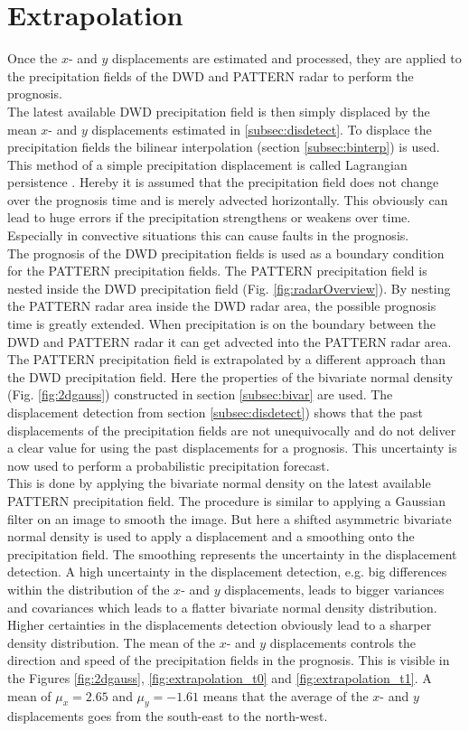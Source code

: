 \documentclass[11pt,twoside,a4paper,fleqn,x11names]{report}
\numberwithin{equation}{chapter}
\numberwithin{figure}{chapter}
\numberwithin{table}{chapter}
\begin{document}
\section{Extrapolation}
\label{subsec:extrapolation}
Once the $x$- and $y$ displacements are estimated and processed, they are applied to the precipitation fields of the DWD and PATTERN radar to perform the prognosis. \\
The latest available DWD precipitation field is then simply displaced by the mean $x$- and $y$ displacements estimated in \ref{subsec:disdetect}. To displace the precipitation fields the bilinear interpolation (section \ref{subsec:binterp}) is used. This method of a simple precipitation displacement is called Lagrangian persistence \citep{Germann}. Hereby it is assumed that the precipitation field does not change over the prognosis time and is merely advected horizontally. This obviously can lead to huge errors if the precipitation strengthens or weakens over time. Especially in convective situations this can cause faults in the prognosis. \\
The prognosis of the DWD precipitation fields is used as a boundary condition for the PATTERN precipitation fields. The PATTERN precipitation field is nested inside the DWD precipitation field (Fig. \ref{fig:radarOverview}). By nesting the PATTERN radar area inside the DWD radar area, the possible prognosis time is greatly extended. When precipitation is on the boundary between the DWD and PATTERN radar it can get advected into the PATTERN radar area.\\
The PATTERN precipitation field is extrapolated by a different approach than the DWD precipitation field. Here the properties of the bivariate normal density (Fig. \ref{fig:2dgauss}) constructed in section \ref{subsec:bivar} are used. The displacement detection from section \ref{subsec:disdetect}) shows that the past displacements of the precipitation fields are not unequivocally and do not deliver a clear value for using the past displacements for a prognosis. This uncertainty is now used to perform a probabilistic precipitation forecast. \\
This is done by applying the bivariate normal density on the latest available PATTERN precipitation field. The procedure is similar to applying a Gaussian filter on an image to smooth the image. But here a shifted asymmetric bivariate normal density is used to apply a displacement and a smoothing onto the precipitation field. The smoothing represents the uncertainty in the displacement detection. A high uncertainty in the displacement detection, e.g. big differences within the distribution of the $x$- and $y$ displacements, leads to bigger variances and covariances which leads to a flatter bivariate normal density distribution. Higher certainties in the displacements detection obviously lead to a sharper density distribution. The mean of the $x$- and $y$ displacements controls the direction and speed of the precipitation fields in the prognosis. This is visible in the Figures \ref{fig:2dgauss}, \ref{fig:extrapolation_t0} and \ref{fig:extrapolation_t1}. A mean of $\mu_x=2.65$ and $\mu_y=-1.61$ means that the average of the $x$- and $y$ displacements goes from the south-east to the north-west.\\
\end{document}
